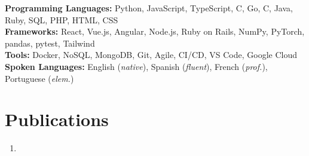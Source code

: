 \documentclass{article}
\def\Cplusplus{C\raisebox{0.5ex}{\tiny\textbf{++}}}
\begin{document}
\noindent
\textbf{Programming Languages:} Python, JavaScript, TypeScript, \Cplusplus, Go, C, Java, Ruby, SQL, PHP, HTML, CSS \\
\textbf{Frameworks:} React, Vue.js, Angular, Node.js, Ruby on Rails, NumPy, PyTorch, pandas, pytest, Tailwind \\
\textbf{Tools:} Docker, NoSQL, MongoDB, Git, Agile, CI/CD, VS Code, Google Cloud\\
\textbf{Spoken Languages:} English (\textit{native}), Spanish (\textit{fluent}), French (\textit{prof.}), Portuguese (\textit{elem.})










\section{Publications}
\begin{enumerate}
    \item \href{https://pubs.rsc.org/en/content/articlelanding/2019/cp/c9cp00837c}{}
\end{enumerate}
\end{document}
